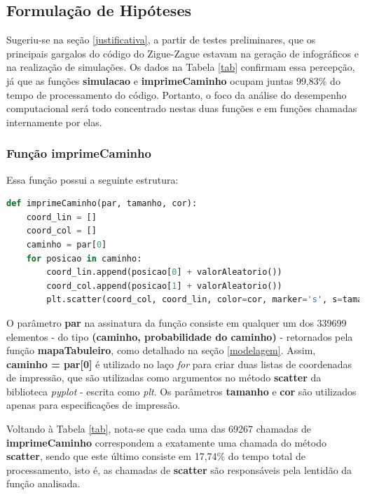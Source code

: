 \documentclass[12pt]{article}
\begin{document}
\subsection{Formulação de Hipóteses}
\label{hipoteses}


Sugeriu-se na seção \ref{justificativa}, a partir de testes preliminares, que os principais gargalos do código do Zigue-Zague estavam na geração de infográficos e na realização de simulações. Os dados na Tabela \ref{tab} confirmam essa percepção, já que as funções \textbf{simulacao} e \textbf{imprimeCaminho} ocupam juntas  99,83\% do tempo de processamento do código. Portanto, o foco da análise do desempenho computacional será todo concentrado nestas duas funções e em funções chamadas internamente por elas.

\subsubsection{Função \textbf{imprimeCaminho}}

Essa função possui a seguinte estrutura:

\begin{lstlisting}[language=Python]
def imprimeCaminho(par, tamanho, cor):
	coord_lin = []
	coord_col = []
	caminho = par[0]
	for posicao in caminho:
		coord_lin.append(posicao[0] + valorAleatorio())
		coord_col.append(posicao[1] + valorAleatorio())
		plt.scatter(coord_col, coord_lin, color=cor, marker='s', s=tamanho)
\end{lstlisting}

O parâmetro \textbf{par} na assinatura da função consiste em qualquer um dos 339699 elementos - do tipo \textbf{(caminho, probabilidade do caminho)} - retornados pela função \textbf{mapaTabuleiro}, como detalhado na seção \ref{modelagem}. Assim, \textbf{caminho = par[0]} é utilizado no laço \textit{for} para criar duas listas de coordenadas de impressão, que são utilizadas como argumentos no método \textbf{scatter} da biblioteca \textit{pyplot} - escrita como \textit{plt}. Os parâmetros \textbf{tamanho} e \textbf{cor} são utilizados apenas para especificações de impressão.

Voltando à Tabela \ref{tab}, nota-se que cada uma das 69267 chamadas de \textbf{imprimeCaminho} correspondem a exatamente uma chamada do método \textbf{scatter}, sendo que este último consiste em 17,74\% do tempo total de processamento, isto é, as chamadas de \textbf{scatter} são responsáveis pela lentidão da função analisada.
\end{document}
